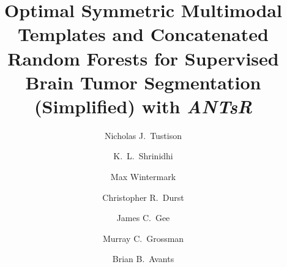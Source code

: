 \documentclass[preprint,authoryear,review,12pt]{elsarticle}
\begin{document}
\begin{frontmatter}

\title{Optimal Symmetric Multimodal Templates and Concatenated Random Forests for Supervised Brain Tumor Segmentation (Simplified) with \textit{ANTsR}}

\author[label1]{Nicholas J.~Tustison
  }
\author[label2]{K.~L.~Shrinidhi}
\author[label1]{Max Wintermark}
\author[label1]{Christopher R.~Durst}
\author[label1]{James C.~Gee}
\author[label3]{Murray C.~Grossman}
\author[label2]{Brian B.~Avants}
\address[label1]{Department of Radiology and Medical Imaging, University of Virginia, Charlottesville, VA}
\address[label2]{Penn Image Computing and Science Laboratory, 
                 Department of Radiology, University of Pennsylvania,
                Philadelphia, PA}
\address[label3]{Department of Neurology, University of Pennsylvania,
                Philadelphia, PA}




\end{frontmatter}
\end{document}
